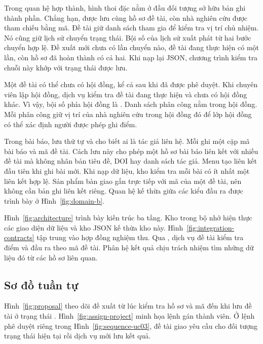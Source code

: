 Trong quan hệ hợp thành, hình thoi đặc nằm ở đầu đối tượng sở hữu bản ghi thành phần. Chẳng hạn,  được lưu cùng hồ sơ đề tài, còn nhà nghiên cứu được tham chiếu bằng mã. Đề tài giữ danh sách tham gia để kiểm tra vị trí chủ nhiệm. Nó cũng giữ lịch sử chuyển trạng thái. Bội số  của lịch sử xuất phát từ hai bước chuyển hợp lệ. Đề xuất mới chưa có lần chuyển nào, đề tài đang thực hiện có một lần, còn hồ sơ đã hoàn thành có cả hai. Khi nạp lại JSON, chương trình kiểm tra chuỗi này khớp với trạng thái được lưu.

Một đề tài có thể chưa có hội đồng, kể cả sau khi đã được phê duyệt. Khi chuyên viên lập hội đồng, dịch vụ kiểm tra đề tài đang thực hiện và chưa có hội đồng khác. Vì vậy, bội số phía hội đồng là . Danh sách phân công nằm trong hội đồng. Mỗi phân công giữ vị trí của nhà nghiên cứu trong hội đồng đó để lớp hội đồng có thể xác định người được phép ghi điểm.

Trong bài báo,  lưu thứ tự và cho biết ai là tác giả liên hệ. Mỗi  ghi một cặp mã bài báo và mã đề tài. Cách lưu này cho phép một hồ sơ bài báo liên kết với nhiều đề tài mà không nhân bản tiêu đề, DOI hay danh sách tác giả. Menu tạo liên kết đầu tiên khi ghi bài mới. Khi nạp dữ liệu, kho kiểm tra mỗi bài có ít nhất một liên kết hợp lệ. Sản phẩm bàn giao gắn trực tiếp với mã của một đề tài, nên không cần bản ghi liên kết riêng. Quan hệ kế thừa giữa các kiểu đầu ra được trình bày ở Hình~\ref{fig:domain-b}.

Hình~\ref{fig:architecture} trình bày kiến trúc ba tầng. Kho trong bộ nhớ hiện thực các giao diện dữ liệu và kho JSON kế thừa kho này. Hình~\ref{fig:integration-contracts} tập trung vào hợp đồng nghiệm thu. Qua , dịch vụ đề tài kiểm tra điểm và đầu ra theo mã đề tài. Phân hệ kết quả chịu trách nhiệm tìm những dữ liệu đó từ các hồ sơ liên quan.

\subsection{Sơ đồ tuần tự}\label{sec:sequences}

Hình~\ref{fig:proposal} theo dõi đề xuất từ lúc kiểm tra hồ sơ và mã đến khi lưu đề tài ở trạng thái . Hình~\ref{fig:assign-project} minh họa lệnh gán thành viên. Ở lệnh phê duyệt riêng trong Hình~\ref{fig:sequence-uc03}, đề tài giao yêu cầu cho đối tượng trạng thái hiện tại rồi dịch vụ mới lưu kết quả.

